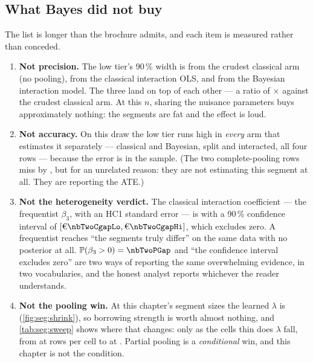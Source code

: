 \subsection*{What Bayes did not buy}

The list is longer than the brochure admits, and each item is measured rather than conceded.

\begin{enumerate}[leftmargin=*, itemsep=.35em]
  \item \textbf{Not precision.} The low tier's 90\,\% width is \eur{\nbTwoWidthNpClsLow} from the
        crudest classical arm (no pooling), \eur{\nbTwoWidthIntClsLow} from the classical
        interaction OLS, and \eur{\nbTwoWidthIntBayesLow} from the Bayesian interaction model. The
        three land on top of each other --- a ratio of \nbTwoWidthRatio$\times$ against the crudest
        classical arm. At this $n$, sharing the nuisance parameters buys approximately nothing: the
        segments are fat and the effect is loud.
  \item \textbf{Not accuracy.} On this draw the low tier runs \eur{\nbTwoSampleErrLow} high in \emph{every} arm
        that estimates it separately --- classical and Bayesian, split and interacted, all four
        rows --- because the error is in the sample. (The two complete-pooling rows miss by
        \eur{\nbTwoCpMissLow}, but for an unrelated reason: they are not estimating this segment at
        all. They are reporting the ATE.)
  \item \textbf{Not the heterogeneity verdict.} The classical interaction coefficient --- the
        frequentist $\beta_3$, with an HC1 standard error --- is \eur{\nbTwoCgap} with a 90\,\%
        confidence interval of $[\eur{\nbTwoCgapLo}, \eur{\nbTwoCgapHi}]$, which excludes zero. A
        frequentist reaches ``the segments truly differ'' on the same data with no posterior at all.
        $\Prob(\beta_3 > 0) = \nbTwoPGap$ and ``the confidence interval excludes zero'' are two ways
        of reporting the same overwhelming evidence, in two vocabularies, and the honest analyst
        reports whichever the reader understands.
  \item \textbf{Not the pooling win.} At this chapter's segment sizes the learned $\lambda$ is
        \nbTwoRealLam{} (\cref{fig:seg:shrink}), so borrowing strength is worth almost nothing, and
        \cref{tab:seg:sweep} shows where that changes: only as the cells thin does $\lambda$ fall,
        from \nbTwoSweepFatLam{} at \nbTwoSweepFatRows{} rows per cell to \nbTwoSweepThinLam{} at
        \nbTwoSweepThinRows. Partial pooling is a \emph{conditional} win, and this chapter is not
        the condition.
\end{enumerate}

